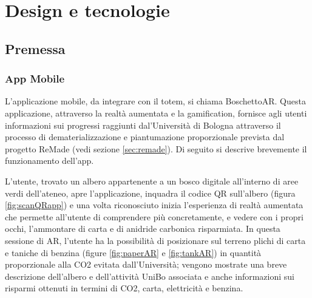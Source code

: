 \chapter{Design e tecnologie}
\section{Premessa}
\subsection{App Mobile}
L'applicazione mobile, da integrare con il totem, si chiama BoschettoAR. Questa applicazione, attraverso la realtà aumentata e la gamification, fornisce agli utenti informazioni sui progressi raggiunti dal'Università di Bologna attraverso il processo di dematerializzazione e piantumazione proporzionale prevista dal progetto ReMade (vedi sezione \ref{sec:remade}). Di seguito si descrive brevemente il funzionamento dell'app.

L'utente, trovato un albero appartenente a un bosco digitale all'interno di aree verdi dell'ateneo, apre l'applicazione, inquadra il codice QR sull'albero (figura \ref{fig:scanQRapp}) e una volta riconosciuto inizia l'esperienza di realtà aumentata che permette all'utente di comprendere più concretamente, e vedere con i propri occhi, l'ammontare di carta e di anidride carbonica risparmiata. In questa sessione di AR, l'utente ha la possibilità di posizionare sul terreno plichi di carta e taniche di benzina (figure \ref{fig:paperAR} e \ref{fig:tankAR}) in quantità proporzionale alla CO2 evitata dall'Università; vengono mostrate una breve descrizione dell'albero e dell'attività UniBo associata e anche informazioni sui risparmi ottenuti in termini di CO2, carta, elettricità e benzina.

